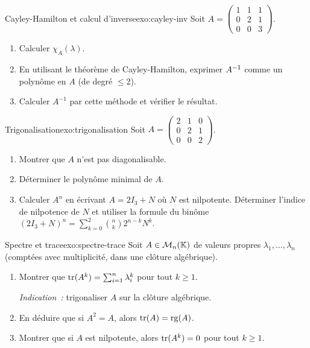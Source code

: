 \begin{exercise}{\challenging{} Cayley-Hamilton et calcul d'inverse}{exo:cayley-inv}
  Soit $A=\begin{pmatrix}1&1&1\\0&2&1\\0&0&3\end{pmatrix}$.
  \begin{enumerate}[label=(\alph*)]
    \item Calculer $\chi_A(\lambda)$.
    \item En utilisant le théorème de Cayley-Hamilton, exprimer
      ${A}^{-1}$ comme un polynôme en $A$ (de degré $\leq 2$).
    \item Calculer $A^{-1}$ par cette méthode et vérifier le résultat.
  \end{enumerate}
\end{exercise}

\begin{exercise}{\challenging{} Trigonalisation}{exo:trigonalisation}
  Soit $A=\begin{pmatrix}2&1&0\\0&2&1\\0&0&2\end{pmatrix}$.
  \begin{enumerate}[label=(\alph*)]
    \item Montrer que $A$ n'est pas diagonalisable.
    \item Déterminer le polynôme minimal de $A$.
    \item Calculer $A^n$ en écrivant $A=2I_3+N$ où $N$ est nilpotente.
      Déterminer l'indice de nilpotence de $N$ et utiliser la formule
      du binôme $(2I_3+N)^n=\sum_{k=0}^{2}\binom{n}{k}2^{n-k}N^k$.
  \end{enumerate}
\end{exercise}

\begin{exercise}{\challenging{} Spectre et trace}{exo:spectre-trace}
  Soit $A\in\mathcal{M}_n({\mathbb{K}})$ de valeurs propres
  $\lambda_1,\ldots,\lambda_n$ (comptées avec multiplicité, dans une
  clôture algébrique).
  \begin{enumerate}[label=(\alph*)]
    \item Montrer que $\operatorname{tr}(A^k)=\sum_{i=1}^n\lambda_i^k$ pour tout
      $k\geq 1$.

      \emph{Indication~:} trigonaliser $A$ sur la clôture algébrique.
    \item En déduire que si $A^2=A$, alors $\operatorname{tr}(A)=\operatorname{rg}(A)$.
    \item Montrer que si $A$ est nilpotente, alors $\operatorname{tr}(A^k)=0$ pour
      tout $k\geq 1$.
  \end{enumerate}
\end{exercise}

